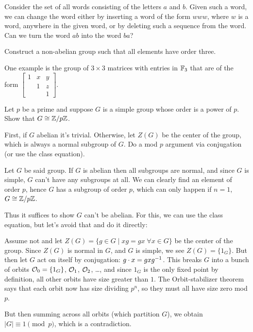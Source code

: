 \begin{problem}
	\onechili
	Consider the set of all words consisting of the letters $a$ and $b$.
	Given such a word, we can change the word either
	by inserting a word of the form $www$,
	where $w$ is a word, anywhere in the given word,
	or by deleting such a sequence from the word.
	Can we turn the word $ab$ into the word $ba$?
	\begin{hint}
		Construct a non-abelian group such that all elements have order three.
	\end{hint}
	\begin{sol}
		One example is the group of $3 \times 3$
		matrices with entries in $\mathbb F_3$ that are of the form
		$\begin{bmatrix}
			1 & x & y \\
			& 1 & z \\
			& & 1
		\end{bmatrix}$.
	\end{sol}
\end{problem}

\begin{problem}
	\twochili
	Let $p$ be a prime and suppose $G$ is a simple group
	whose order is a power of $p$.
	Show that $G \cong \mathbb Z/p\mathbb Z$.

	\begin{hint}
		First, if $G$ abelian it's trivial.
		Otherwise, let $Z(G)$ be the center of the group,
		which is always a normal subgroup of $G$.
		Do a mod $p$ argument via conjugation (or use the class equation).
	\end{hint}
	\begin{sol}
		Let $G$ be said group.
		If $G$ is abelian then all subgroups are normal,
		and since $G$ is simple, $G$ can't have any subgroups at all.
		We can clearly find an element of order $p$, hence $G$ has a subgroup
		of order $p$, which can only happen if $n=1$, $G \cong \mathbb Z/p\mathbb Z$.

		Thus it suffices to show $G$ can't be abelian.
		For this, we can use the class equation, but let's avoid that and do it directly:

		Assume not and let $Z(G) = \{ g \in G \mid xg = gx \; \forall x \in G \}$
		be the center of the group.
		Since $Z(G)$ is normal in $G$, and $G$ is simple, we see $Z(G) = \{1_G\}$.
		But then let $G$ act on itself by conjugation: $g \cdot x = gxg^{-1}$.
		This breaks $G$ into a bunch of orbits $\mathcal O_0 = \{1_G\}$, $\mathcal O_1$, $\mathcal O_2$, \dots,
		and since $1_G$ is the only fixed point by definition, all other orbits
		have size greater than $1$.
		The Orbit-stabilizer theorem says that each orbit now has size dividing $p^n$,
		so they must all have size zero mod $p$.

		But then summing across all orbits (which partition $G$),
		we obtain $\left\lvert G \right\rvert \equiv 1 \pmod p$,
		which is a contradiction.
	\end{sol}
\end{problem}

